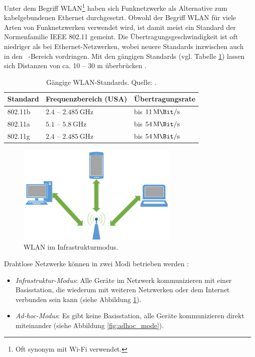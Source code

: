 Unter dem Begriff \ac{WLAN}\footnote{Oft synonym mit Wi-Fi verwendet.} haben sich Funknetzwerke als Alternative zum kabelgebundenen Ethernet durchgesetzt. Obwohl der Begriff \ac{WLAN} für viele Arten von Funknetzwerken verwendet wird, ist damit meist ein Standard der Normenfamilie IEEE 802.11 gemeint. Die Übertragungsgeschwindigkeit ist oft niedriger als bei Ethernet-Netzwerken, wobei neuere Standards inzwischen auch in den \si{\giga\Bit}-Bereich vordringen. Mit den gängigen Standards (vgl. Tabelle \ref{tab:wlan}) lassen sich Distanzen von ca. 10 -- 30 m überbrücken \citep[552]{Kurose2014}.

\begin{table}[h]
\centering
{}
\begin{tabular}{lll@{}}\toprule
Standard & Frequenzbereich (USA) & Übertragungsrate \\ 
\midrule
802.11b & \(2.4\) -- \(\SI{2.485}{\giga\hertz}\) & bis \(\SI{11}{\mega\Bit\per\second}\) \\ 
802.11a & \(5.1\) -- \(\SI{5.8}{\giga\hertz}\) & bis \(\SI{54}{\mega\Bit\per\second}\) \\ 
802.11g & \(2.4\) -- \(\SI{2.485}{\giga\hertz}\) & bis \(\SI{54}{\mega\Bit\per\second}\) \\ 
\bottomrule
\end{tabular} 
\caption{Gängige WLAN-Standards. Quelle: \citep[562]{Kurose2014}.}
\label{tab:wlan}
\end{table}

\begin{figure}[h]
\centering
\includegraphics[width=0.7\textwidth]{bilder/infrastruktur_modus}
\caption{\ac{WLAN} im Infrastrukturmodus.}
\label{fig:infrastructure_mode}
\end{figure}

Drahtlose Netzwerke können in zwei Modi betrieben werden \citep[555]{Kurose2014}:
\begin{itemize}
\item \textit{Infrastruktur-Modus}: Alle Geräte im Netzwerk kommunizieren mit einer Basisstation, die wiederum mit weiteren Netzwerken oder dem Internet verbunden sein kann (siehe Abbildung \ref{fig:infrastructure_mode}).
\item \textit{Ad-hoc-Modus}: Es gibt keine Basisstation, alle Geräte kommunizieren direkt miteinander (siehe Abbildung \ref{fig:adhoc_mode}).
\end{itemize}

